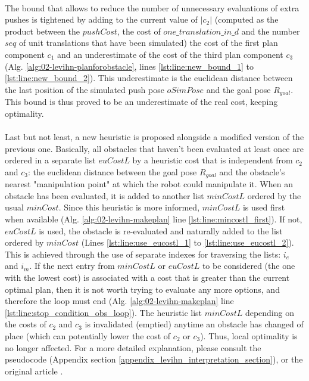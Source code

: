 \paragraph{} The bound that allows to reduce the number of unnecessary evaluations of extra pushes is tightened by adding to the current value of $|c_{2}|$ (computed as the product between the $pushCost$, the cost of $one\_translation\_in\_d$ and the number $seq$ of unit translations that have been simulated) the cost of the first plan component $c_{1}$ and an underestimate of the cost of the third plan component $c_{3}$ (Alg. \ref{alg:02-levihn-planforobstacle}, lines \ref{lst:line:new_bound_1} to \ref{lst:line:new_bound_2}). This underestimate is the euclidean distance between the last position of the simulated push pose $oSimPose$ and the goal pose $R_{goal}$. This bound is thus proved to be an underestimate of the real cost, keeping optimality.

\paragraph{} Last but not least, a new heuristic is proposed alongside a modified version of the previous one. Basically, all obstacles that haven't been evaluated at least once are ordered in a separate list $euCostL$ by a heuristic cost that is independent from $c_{2}$ and $c_{3}$: the euclidean distance between the goal pose $R_{goal}$ and the obstacle's nearest "manipulation point" at which the robot could manipulate it. When an obstacle has been evaluated, it is added to another list $minCostL$ ordered by the usual $minCost$. Since this heuristic is more informed, $minCostL$ is used first when available (Alg. \ref{alg:02-levihn-makeplan} line \ref{lst:line:mincostl_first}). If not, $euCostL$ is used, the obstacle is re-evaluated and naturally added to the list ordered by $minCost$ (Lines \ref{lst:line:use_eucostl_1} to \ref{lst:line:use_eucostl_2}). This is achieved through the use of separate indexes for traversing the lists: $i_{e}$ and $i_{m}$. If the next entry from $minCostL$ or $euCostL$ to be considered (the one with the lowest cost) is associated with a cost that is greater than the current optimal plan, then it is not worth trying to evaluate any more options, and therefore the loop must end (Alg. \ref{alg:02-levihn-makeplan} line \ref{lst:line:stop_condition_obs_loop}). The heuristic list $minCostL$ depending on the costs of $c_{2}$ and $c_{3}$ is invalidated (emptied) anytime an obstacle has changed of place (which can potentially lower the cost of $c_{2}$ or $c_{3}$). Thus, local optimality is no longer affected. For a more detailed explanation, please consult the pseudocode (Appendix section \ref{appendix_levihn_interpretation_section}), or the original article \parencite{levihn_locally_2014}.

